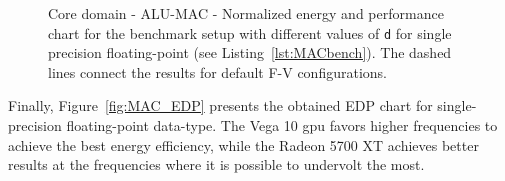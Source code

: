 
\begin{figure}[!htb]
    \centering
    \begin{subfigmatrix}{2}
      \label{fig:MAC_behaviour}
    \end{subfigmatrix}
    \caption{Core domain - ALU-MAC - Normalized energy and performance chart for the benchmark setup with different values of \texttt{d} for single precision floating-point (see Listing~\ref{lst:MACbench}). The dashed lines connect the results for default F-V configurations.}
\end{figure}

Finally, Figure~\ref{fig:MAC_EDP} presents the obtained EDP chart for single-precision floating-point data-type. The Vega 10 \acrshort{gpu} favors higher frequencies to achieve the best energy efficiency, while the Radeon 5700 XT achieves better results at the frequencies where it is possible to undervolt the most.

